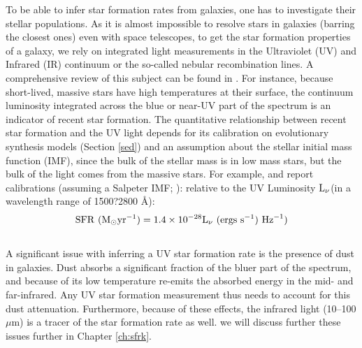 To be able to infer star formation rates from galaxies, one has to
investigate their stellar populations. As it is almost impossible to
resolve stars in galaxies (barring the closest ones) even with space
telescopes, to get the star formation properties of a galaxy, we rely
on integrated light measurements in the Ultraviolet (UV) and Infrared
(IR) continuum or the so-called nebular recombination lines. A
comprehensive review of this subject can be found in
\citet{kennicutt_star_2012}. For instance, because short-lived,
massive stars have high temperatures at their surface, the continuum
luminosity integrated across the blue or near-UV part of the spectrum
is an indicator of recent star formation.  The quantitative
relationship between recent star formation and the UV light depends
for its calibration on evolutionary synthesis models (Section
\ref{sed}) and an assumption about the stellar initial mass function
(IMF), since the bulk of the stellar mass is in low mass stars, but
the bulk of the light comes from the massive stars. For example,
\citet{1998ApJ...498..106M} and \citet{kennicutt_star_2012} report
calibrations (assuming a Salpeter IMF; \citealt{1955ApJ...121..161S}):
relative to the UV Luminosity ${\rm L}_{\nu}$(in a wavelength range of
1500?2800 \AA):
$${\rm SFR}\hbox{ }({\rm M}_{\odot} {\rm yr}^{-1}) = 1.4 \times 10^{-28} {\rm L}_{\rm \nu} \hbox{ }({\rm ergs }\hbox{ } {\rm s}^{-1})\hbox{ } {\rm Hz}^{-1})$$\\

A significant issue with inferring a UV star formation rate is the
presence of dust in galaxies. Dust absorbs a significant fraction of
the bluer part of the spectrum, and because of its low temperature
re-emits the absorbed energy in the mid- and far-infrared. Any UV star
formation measurement thus needs to account for this dust
attenuation. Furthermore, because of these effects, the infrared light
(10--100 $\mu$m) is a tracer of the star formation rate as well.  we
will discuss further these issues further in Chapter \ref{ch:sfrk}.


